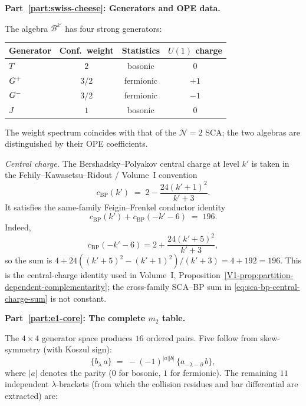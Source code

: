 \begin{computation}[The ordered bar complex of the
Bershadsky--Polyakov algebra
$\mathcal{B}^{k'} = W_{k'}(\mathfrak{sl}_3,f_{\min})$;
\ClaimStatusProvedHere]
\label{comp:ordered-bar-bp}

\medskip
\noindent\textbf{Part~\ref{part:swiss-cheese}: Generators and OPE data.}

The algebra $\mathcal{B}^{k'}$ has four strong generators:
\begin{center}
\renewcommand{\arraystretch}{1.15}
\begin{tabular}{lccc}
\textbf{Generator} & \textbf{Conf.\ weight} &
\textbf{Statistics} & \textbf{$U(1)$ charge} \\
\hline
$T$ & $2$ & bosonic & $0$ \\
$G^+$ & $3/2$ & fermionic & $+1$ \\
$G^-$ & $3/2$ & fermionic & $-1$ \\
$J$ & $1$ & bosonic & $0$
\end{tabular}
\end{center}
The weight spectrum coincides with that of the $\mathcal N=2$
SCA; the two algebras are distinguished by their OPE
coefficients.

\emph{Central charge.}
The Bershadsky--Polyakov central charge at level $k'$ is taken in
the Fehily--Kawasetsu--Ridout / Volume~I convention
\begin{equation}\label{eq:bp-central-charge-FKR}
c_{\mathrm{BP}}(k')
\;=\;
2-\frac{24(k'+1)^2}{k'+3}.
\end{equation}
It satisfies the same-family Feigin--Frenkel conductor identity
\begin{equation}\label{eq:bp-FKR-complementarity}
c_{\mathrm{BP}}(k')+c_{\mathrm{BP}}(-k'-6)
\;=\; 196.
\end{equation}
Indeed,
\[
c_{\mathrm{BP}}(-k'-6)
=2+\frac{24(k'+5)^2}{k'+3},
\]
so the sum is
$4+24((k'+5)^2-(k'+1)^2)/(k'+3)=4+192=196$.
This is the central-charge identity used in Volume~I,
Proposition~\ref*{V1-prop:partition-dependent-complementarity};
the cross-family SCA--BP sum in
\eqref{eq:sca-bp-central-charge-sum} is not constant.

\medskip
\noindent\textbf{Part~\ref{part:e1-core}: The complete $m_2$ table.}

The $4\times 4$ generator space produces $16$ ordered pairs.
Five follow from skew-symmetry (with Koszul sign):
\begin{equation}\label{eq:bp-skew-symmetry}
\{b_\lambda\, a\}
\;=\;
-(-1)^{|a||b|}\,\{a_{-\lambda-\partial}\,b\},
\end{equation}
where $|a|$ denotes the parity ($0$ for bosonic, $1$ for
fermionic). The remaining $11$ independent $\lambda$-brackets
(from which the collision residues and bar differential are
extracted) are:


\end{computation}
